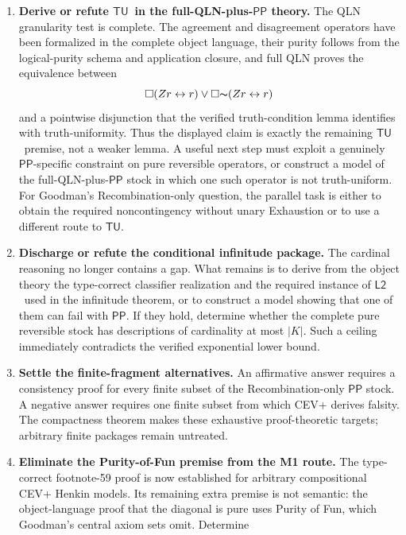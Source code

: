 \documentclass[12pt,leqno]{article}
\newcommand{\OR}{\ensuremath{\vee}}
\newcommand{\NOT}{\ensuremath{\text{$\thicksim$}}}
\theoremstyle{plain}
\theoremstyle{definition}
\newcommand{\PP}{\ensuremath{\mathsf{PP}}}
\newcommand{\Ltwo}{\ensuremath{\mathsf{L2}}}
\newcommand{\TU}{\ensuremath{\mathsf{TU}}}
\begin{document}
\begin{enumerate}
\item \textbf{Derive or refute \TU\ in the full-QLN-plus-\PP{} theory.}
      The QLN granularity test is complete.  The agreement and disagreement
      operators have been formalized in the complete object language, their
      purity follows from the logical-purity schema and application closure,
      and full QLN proves the equivalence between
      \[
        \Box(Zr\leftrightarrow r)
        \mathbin{\OR}\Box\NOT(Zr\leftrightarrow r)
      \]
      and a pointwise disjunction that the verified truth-condition lemma
      identifies with truth-uniformity.  Thus
      the displayed claim is exactly the remaining \TU\ premise, not a weaker
      lemma.  A useful next step must exploit a genuinely \PP-specific
      constraint on pure reversible operators, or construct a model of the
      full-QLN-plus-\PP{} stock in which one such operator is not
      truth-uniform.  For Goodman's Recombination-only question, the parallel
      task is either to obtain the required noncontingency without unary
      Exhaustion or to use a different route to \TU.
\item \textbf{Discharge or refute the conditional infinitude package.}
      The cardinal reasoning no longer contains a gap.  What remains is to
      derive from the object theory the type-correct classifier realization
      and the required instance of \Ltwo\ used in the infinitude theorem, or to construct a model
      showing that one of them can fail with \PP.  If they hold, determine
      whether the complete pure reversible stock has descriptions of
      cardinality at most \(|K|\).  Such a ceiling immediately contradicts
      the verified exponential lower bound.
\item \textbf{Settle the finite-fragment alternatives.}
      An affirmative answer requires a consistency proof for every finite
      subset of the Recombination-only \(\PP\) stock.  A negative answer
      requires one finite subset from which CEV+ derives falsity.  The
      compactness theorem makes these exhaustive proof-theoretic targets;
      arbitrary finite packages remain untreated.
\item \textbf{Eliminate the Purity-of-Fun premise from the M1 route.}
      The type-correct footnote-59 proof is now established for arbitrary
      compositional CEV+ Henkin models.  Its remaining extra premise is not
      semantic: the object-language proof that the diagonal is pure uses
      Purity of Fun, which Goodman's central axiom sets omit.  Determine

\end{enumerate}
\end{document}
